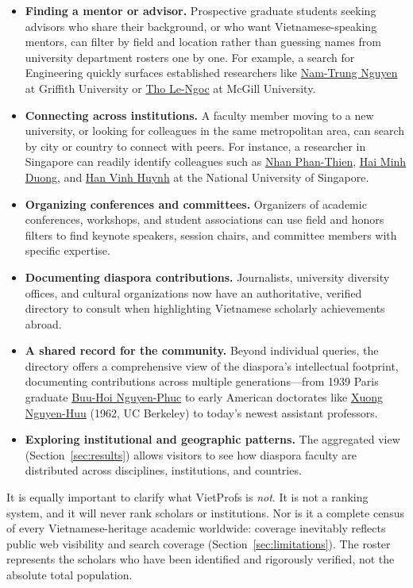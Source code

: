 \documentclass[11pt]{article}
\newcommand{\vplink}[2]{\href{https://vietprofs.roars.dev/?q=#1}{#2}}
\begin{document}
\begin{itemize}
\item \textbf{Finding a mentor or advisor.} Prospective graduate students seeking advisors who share their background, or who want Vietnamese-speaking mentors, can filter by field and location rather than guessing names from university department rosters one by one. For example, a search for Engineering quickly surfaces established researchers like \vplink{Nam-Trung+Nguyen}{Nam-Trung Nguyen} at Griffith University or \vplink{Tho+Le-Ngoc}{Tho Le-Ngoc} at McGill University.
\item \textbf{Connecting across institutions.} A faculty member moving to a new university, or looking for colleagues in the same metropolitan area, can search by city or country to connect with peers. For instance, a researcher in Singapore can readily identify colleagues such as \vplink{Nhan+Phan-Thien}{Nhan Phan-Thien}, \vplink{Hai+Minh+Duong}{Hai Minh Duong}, and \vplink{Han+Vinh+Huynh}{Han Vinh Huynh} at the National University of Singapore.
\item \textbf{Organizing conferences and committees.} Organizers of academic conferences, workshops, and student associations can use field and honors filters to find keynote speakers, session chairs, and committee members with specific expertise.
\item \textbf{Documenting diaspora contributions.} Journalists, university diversity offices, and cultural organizations now have an authoritative, verified directory to consult when highlighting Vietnamese scholarly achievements abroad.
\item \textbf{A shared record for the community.} Beyond individual queries, the directory offers a comprehensive view of the diaspora's intellectual footprint, documenting contributions across multiple generations---from 1939 Paris graduate \vplink{Buu-Hoi+Nguyen-Phuc}{Buu-Hoi Nguyen-Phuc} to early American doctorates like \vplink{Xuong+Nguyen-Huu}{Xuong Nguyen-Huu} (1962, UC Berkeley) to today's newest assistant professors.
\item \textbf{Exploring institutional and geographic patterns.} The aggregated view (Section~\ref{sec:results}) allows visitors to see how diaspora faculty are distributed across disciplines, institutions, and countries.
\end{itemize}

It is equally important to clarify what VietProfs is \emph{not}.
It is not a ranking system, and it will never rank scholars or institutions.
Nor is it a complete census of every Vietnamese-heritage academic worldwide: coverage inevitably reflects public web visibility and search coverage (Section~\ref{sec:limitations}).
The roster represents the scholars who have been identified and rigorously verified, not the absolute total population.
\end{document}

